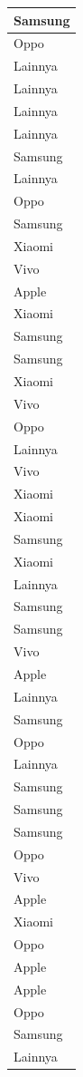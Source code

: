 \documentclass[
  letterpaper,
  DIV=11,
  numbers=noendperiod]{scrartcl}
\begin{document}
\begin{table}
\begin{tabular}[t]{l}
\hline
Samsung\\
\hline
Oppo\\
\hline
Lainnya\\
\hline
Lainnya\\
\hline
Lainnya\\
\hline
Lainnya\\
\hline
Samsung\\
\hline
Lainnya\\
\hline
Oppo\\
\hline
Samsung\\
\hline
Xiaomi\\
\hline
Vivo\\
\hline
Apple\\
\hline
Xiaomi\\
\hline
Samsung\\
\hline
Samsung\\
\hline
Xiaomi\\
\hline
Vivo\\
\hline
Oppo\\
\hline
Lainnya\\
\hline
Vivo\\
\hline
Xiaomi\\
\hline
Xiaomi\\
\hline
Samsung\\
\hline
Xiaomi\\
\hline
Lainnya\\
\hline
Samsung\\
\hline
Samsung\\
\hline
Vivo\\
\hline
Apple\\
\hline
Lainnya\\
\hline
Samsung\\
\hline
Oppo\\
\hline
Lainnya\\
\hline
Samsung\\
\hline
Samsung\\
\hline
Samsung\\
\hline
Oppo\\
\hline
Vivo\\
\hline
Apple\\
\hline
Xiaomi\\
\hline
Oppo\\
\hline
Apple\\
\hline
Apple\\
\hline
Oppo\\
\hline
Samsung\\
\hline
Lainnya\\

\end{tabular}
\end{table}
\end{document}
